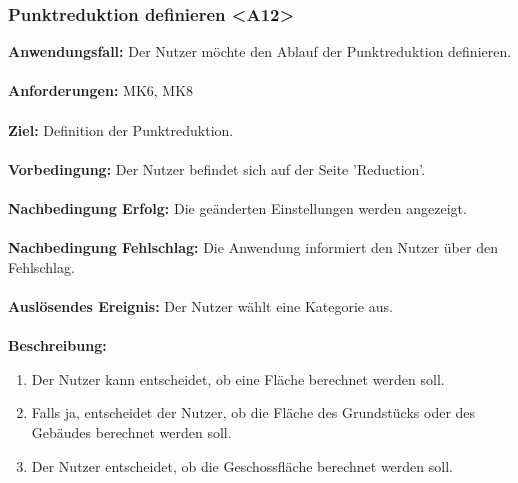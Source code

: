 \documentclass[parskip=full]{scrartcl} %
\begin{document}
\subsubsection*{Punktreduktion definieren <A12>}
\textbf{Anwendungsfall:} Der Nutzer möchte den Ablauf der Punktreduktion definieren.\\\\
\textbf{Anforderungen:} MK6, MK8\\\\
\textbf{Ziel:} Definition der Punktreduktion. \\\\
\textbf{Vorbedingung:} Der Nutzer befindet sich auf der Seite 'Reduction'.\\\\
\textbf{Nachbedingung Erfolg:} Die geänderten Einstellungen werden angezeigt. \\\\
\textbf{Nachbedingung Fehlschlag:} Die Anwendung informiert den Nutzer über den Fehlschlag. \\\\
\textbf{Auslösendes Ereignis:} Der Nutzer wählt eine Kategorie aus. \\\\
\textbf{Beschreibung:}
\begin{enumerate}
    \item Der Nutzer kann entscheidet, ob eine Fläche berechnet werden soll.
    \item Falls ja, entscheidet der Nutzer, ob die Fläche des Grundstücks oder des Gebäudes berechnet werden soll.
    \item Der Nutzer entscheidet, ob die Geschossfläche berechnet werden soll.
\end{enumerate}
\newpage
\end{document}
